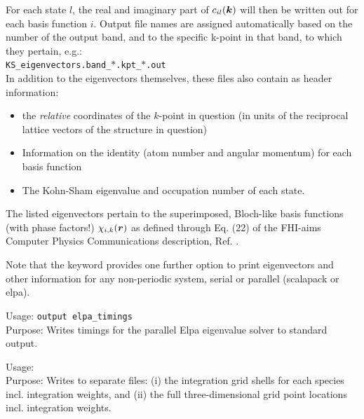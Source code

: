 For each state $l$, the real and imaginary part of
$c_{il}(\mbox{\boldmath$k$})$ will then be written out for each basis function
$i$. Output file names are assigned automatically based on the number of the
output band, and to the specific k-point in that band, to which they pertain,
e.g.: 
\\[1.0ex]
\texttt{KS\_eigenvectors.band\_$\ast$.kpt\_$\ast$.out} \\[1.0ex]
In addition to the eigenvectors themselves, these files also contain as header
information:\\[-2.0ex]
\begin{itemize}
  \item the \emph{relative} coordinates of the $k$-point in question (in
    units of the reciprocal lattice vectors of the structure in question) \\[-2.0ex]
  \item Information on the identity (atom number and angular momentum) for
    each basis function \\[-2.0ex]
  \item The Kohn-Sham eigenvalue and occupation number of each state. \\[-2.0ex]
\end{itemize}
The listed eigenvectors pertain to the superimposed, Bloch-like basis
functions (with phase factors!) $\chi_{i,k}(\mbox{\boldmath$r$})$ as defined
through Eq. (22) of the FHI-aims Computer Physics Communications description,
Ref. \cite{Blum08}.

Note that the   keyword
provides one further option to print eigenvectors and other 
information for any non-periodic system, serial or parallel (scalapack
or elpa). 


{
  \noindent
  Usage: \texttt{output elpa\_timings}  \\[1.0ex]
  Purpose: Writes timings for the parallel Elpa eigenvalue solver to standard
  output.  \\
}


{
  \noindent
  Usage:   \\[1.0ex]
  Purpose: Writes to separate files: (i) the
     integration grid shells for each
    species incl. integration weights, and (ii) the full
    three-dimensional grid point locations incl. integration weights. \\[1.0ex]
}

